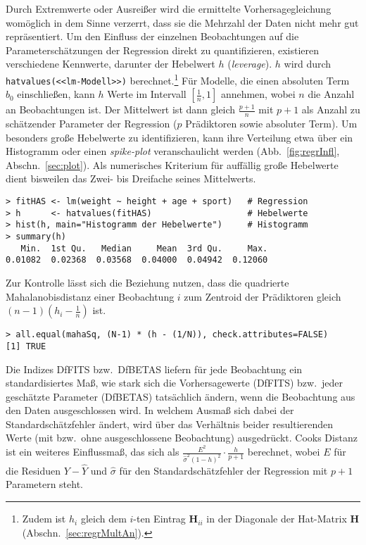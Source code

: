 Durch Extremwerte oder Ausreißer wird die ermittelte Vorhersagegleichung womöglich in dem Sinne verzerrt, dass sie die Mehrzahl der Daten nicht mehr gut repräsentiert. Um den Einfluss der einzelnen Beobachtungen auf die Parameterschätzungen der Regression direkt zu quantifizieren, existieren verschiedene Kennwerte, darunter der Hebelwert $h$ (\emph{leverage}). $h$ wird durch \lstinline!hatvalues(<<lm-Modell>>)! berechnet.\footnote{Zudem ist $h_{i}$ gleich dem $i$-ten Eintrag $\bm{H}_{ii}$ in der Diagonale der Hat-Matrix $\bm{H}$ (Abschn.\ \ref{sec:regrMultAn}).} Für Modelle, die einen absoluten Term $b_{0}$ einschließen, kann $h$ Werte im Intervall $[\frac{1}{n}, 1]$ annehmen, wobei $n$ die Anzahl an Beobachtungen ist. Der Mittelwert ist dann gleich $\frac{p+1}{n}$ mit $p+1$ als Anzahl zu schätzender Parameter der Regression ($p$ Prädiktoren sowie absoluter Term). Um besonders große Hebelwerte zu identifizieren, kann ihre Verteilung etwa über ein Histogramm oder einen \emph{spike-plot} veranschaulicht werden (Abb.\ \ref{fig:regrInfl}, Abschn.\ \ref{sec:plot}). Als numerisches Kriterium für auffällig große Hebelwerte dient bisweilen das Zwei- bis Dreifache seines Mittelwerts.
\begin{lstlisting}
> fitHAS <- lm(weight ~ height + age + sport)   # Regression
> h      <- hatvalues(fitHAS)                   # Hebelwerte
> hist(h, main="Histogramm der Hebelwerte")     # Histogramm
> summary(h)
   Min.  1st Qu.   Median     Mean  3rd Qu.     Max.
0.01082  0.02368  0.03568  0.04000  0.04942  0.12060
\end{lstlisting}

Zur Kontrolle lässt sich die Beziehung nutzen, dass die quadrierte Mahalanobisdistanz einer Beobachtung $i$ zum Zentroid der Prädiktoren gleich $(n-1) (h_{i} - \frac{1}{n})$ ist.
\begin{lstlisting}
> all.equal(mahaSq, (N-1) * (h - (1/N)), check.attributes=FALSE)
[1] TRUE
\end{lstlisting}

Die Indizes DfFITS bzw.\ DfBETAS liefern für jede Beobachtung ein standardisiertes Maß, wie stark sich die Vorhersagewerte (DfFITS) bzw.\ jeder geschätzte Parameter (DfBETAS) tatsächlich ändern, wenn die Beobachtung aus den Daten ausgeschlossen wird. In welchem Ausmaß sich dabei der Standardschätzfehler ändert, wird über das Verhältnis beider resultierenden Werte (mit bzw.\ ohne ausgeschlossene Beobachtung) ausgedrückt. Cooks Distanz ist ein weiteres Einflussmaß, das sich als $\frac{E^{2}}{\hat{\sigma}^{2} (1-h)^{2}} \cdot \frac{h}{p+1}$ berechnet, wobei $E$ für die Residuen $Y - \hat{Y}$ und $\hat{\sigma}$ für den Standardschätzfehler der Regression mit $p+1$ Parametern steht.

